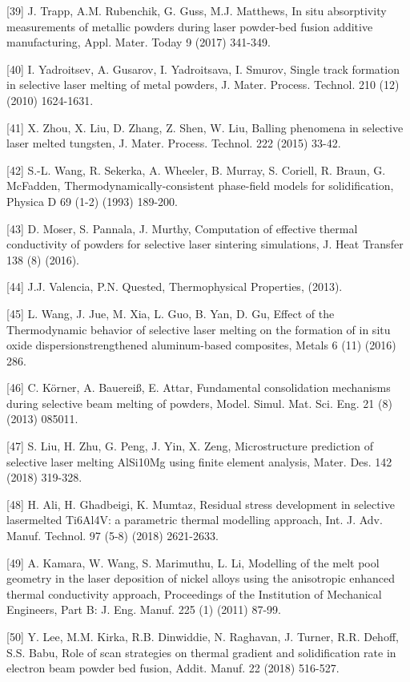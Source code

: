 \documentclass[10pt]{article}
\begin{document}
[39] J. Trapp, A.M. Rubenchik, G. Guss, M.J. Matthews, In situ absorptivity measurements of metallic powders during laser powder-bed fusion additive manufacturing, Appl. Mater. Today 9 (2017) 341-349.

[40] I. Yadroitsev, A. Gusarov, I. Yadroitsava, I. Smurov, Single track formation in selective laser melting of metal powders, J. Mater. Process. Technol. 210 (12) (2010) 1624-1631.

[41] X. Zhou, X. Liu, D. Zhang, Z. Shen, W. Liu, Balling phenomena in selective laser melted tungsten, J. Mater. Process. Technol. 222 (2015) 33-42.

[42] S.-L. Wang, R. Sekerka, A. Wheeler, B. Murray, S. Coriell, R. Braun, G. McFadden, Thermodynamically-consistent phase-field models for solidification, Physica D 69 (1-2) (1993) 189-200.

[43] D. Moser, S. Pannala, J. Murthy, Computation of effective thermal conductivity of powders for selective laser sintering simulations, J. Heat Transfer 138 (8) (2016).

[44] J.J. Valencia, P.N. Quested, Thermophysical Properties, (2013).

[45] L. Wang, J. Jue, M. Xia, L. Guo, B. Yan, D. Gu, Effect of the Thermodynamic behavior of selective laser melting on the formation of in situ oxide dispersionstrengthened aluminum-based composites, Metals 6 (11) (2016) 286.

[46] C. Körner, A. Bauereiß, E. Attar, Fundamental consolidation mechanisms during selective beam melting of powders, Model. Simul. Mat. Sci. Eng. 21 (8) (2013) 085011.

[47] S. Liu, H. Zhu, G. Peng, J. Yin, X. Zeng, Microstructure prediction of selective laser melting AlSi10Mg using finite element analysis, Mater. Des. 142 (2018) 319-328.

[48] H. Ali, H. Ghadbeigi, K. Mumtaz, Residual stress development in selective lasermelted Ti6Al4V: a parametric thermal modelling approach, Int. J. Adv. Manuf. Technol. 97 (5-8) (2018) 2621-2633.

[49] A. Kamara, W. Wang, S. Marimuthu, L. Li, Modelling of the melt pool geometry in the laser deposition of nickel alloys using the anisotropic enhanced thermal conductivity approach, Proceedings of the Institution of Mechanical Engineers, Part B: J. Eng. Manuf. 225 (1) (2011) 87-99.

[50] Y. Lee, M.M. Kirka, R.B. Dinwiddie, N. Raghavan, J. Turner, R.R. Dehoff, S.S. Babu, Role of scan strategies on thermal gradient and solidification rate in electron beam powder bed fusion, Addit. Manuf. 22 (2018) 516-527.
\end{document}
